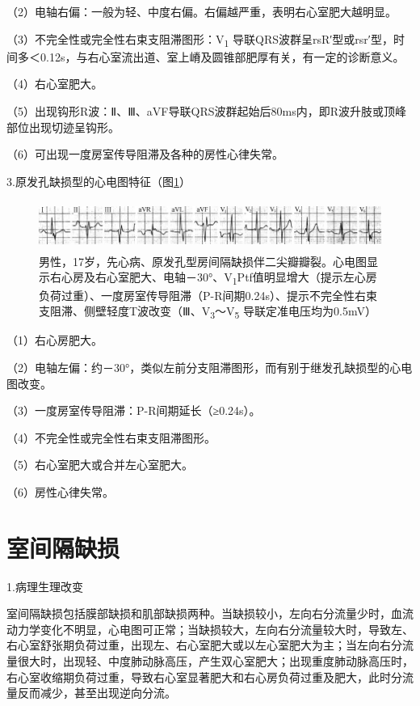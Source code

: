 （2）电轴右偏：一般为轻、中度右偏。右偏越严重，表明右心室肥大越明显。

（3）不完全性或完全性右束支阻滞图形：V\textsubscript{1}
导联QRS波群呈rsR′型或rsr′型，时间多＜0.12s，与右心室流出道、室上嵴及圆锥部肥厚有关，有一定的诊断意义。

（4）右心室肥大。

（5）出现钩形R波：Ⅱ、Ⅲ、aVF导联QRS波群起始后80ms内，即R波升肢或顶峰部位出现切迹呈钩形。

（6）可出现一度房室传导阻滞及各种的房性心律失常。

3.原发孔缺损型的心电图特征（图\ref{fig41-3}）

\begin{figure}[!htbp]
 \centering
 \includegraphics[width=5.78125in,height=0.63542in]{./images/Image00685.jpg}
 \captionsetup{justification=centering}
 \caption{男性，17岁，先心病、原发孔型房间隔缺损伴二尖瓣瓣裂。心电图显示右心房及右心室肥大、电轴－30°、V\textsubscript{1}Ptf值明显增大（提示左心房负荷过重）、一度房室传导阻滞（P-R间期0.24s）、提示不完全性右束支阻滞、侧壁轻度T波改变（Ⅲ、V\textsubscript{3}～V\textsubscript{5} 导联定准电压均为0.5mV）}
 \label{fig41-3}
  \end{figure} 


（1）右心房肥大。

（2）电轴左偏：约－30°，类似左前分支阻滞图形，而有别于继发孔缺损型的心电图改变。

（3）一度房室传导阻滞：P-R间期延长（≥0.24s）。

（4）不完全性或完全性右束支阻滞图形。

（5）右心室肥大或合并左心室肥大。

（6）房性心律失常。

\protect\hypertarget{text00049.htmlux5cux23subid582}{}{}

\section{室间隔缺损}

1.病理生理改变

室间隔缺损包括膜部缺损和肌部缺损两种。当缺损较小，左向右分流量少时，血流动力学变化不明显，心电图可正常；当缺损较大，左向右分流量较大时，导致左、右心室舒张期负荷过重，出现左、右心室肥大或以左心室肥大为主；当左向右分流量很大时，出现轻、中度肺动脉高压，产生双心室肥大；出现重度肺动脉高压时，右心室收缩期负荷过重，导致右心室显著肥大和右心房负荷过重及肥大，此时分流量反而减少，甚至出现逆向分流。

